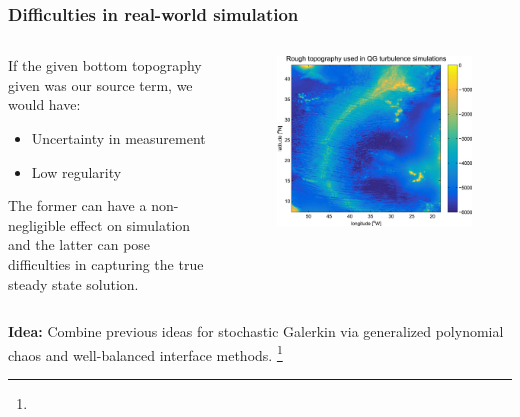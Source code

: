 \documentclass[
    pdf,
    11pt,
    xcolor={svgnames},
  ]{beamer}
\newcommand\blfootnote[1]{%
  \begingroup
  \renewcommand\thefootnote{}\footnote{\scriptsize #1}%
  \addtocounter{footnote}{-1}%
  \endgroup
}
\begin{document}
\begin{frame}
    \frametitle{Difficulties in real-world simulation}
    \begin{columns}
    \begin{column}{0.5\textwidth}
    If the given bottom topography given was our source term, we would have:
    \vspace{-1em}
    \begin{itemize}
        \item Uncertainty in measurement
        \item Low regularity
    \end{itemize}
    The former can have a non-negligible effect on simulation and the latter can pose difficulties in capturing the true steady state solution.
    \end{column}
    \begin{column}{0.5\textwidth}
        \begin{figure}
        \centering
        \includegraphics[width=\textwidth]{bottom_topography.jpg}
        \end{figure}
    \end{column}
    \end{columns}
    {\bf Idea:} Combine previous ideas for stochastic Galerkin via generalized polynomial chaos and well-balanced interface methods.
    \blfootnote{}
\end{frame}

\end{document}
